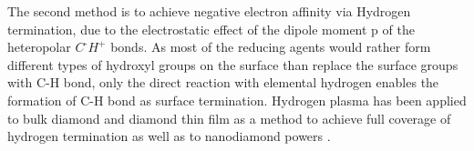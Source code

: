 The second method is to achieve negative electron affinity via Hydrogen termination, due to the electrostatic effect of the dipole moment p of the heteropolar $C^{\text{-}} H^{+}$ bonds. As most of the reducing agents would rather form different types of hydroxyl groups on the surface than replace the surface groups with C-H bond, only the direct reaction with elemental hydrogen enables the formation of C-H bond as surface termination. Hydrogen plasma has been applied to bulk diamond and diamond thin film as a method to achieve full coverage of hydrogen termination as well as to nanodiamond powers \citep{yeap_detonation_2009}.
